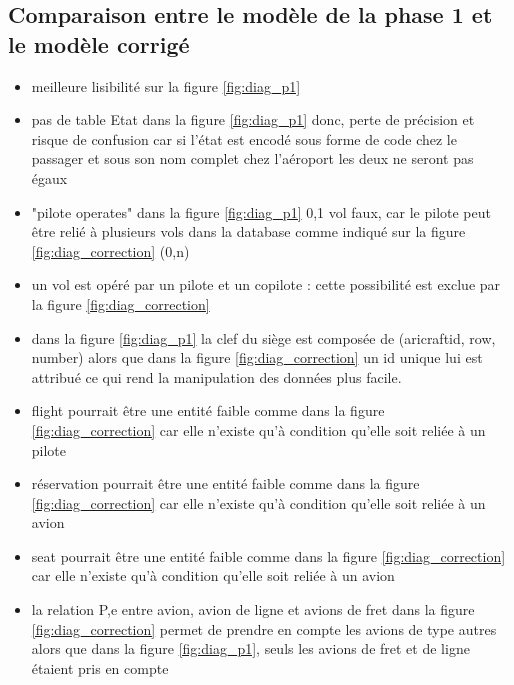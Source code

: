 \documentclass[french, utf8]{article}
\begin{document}
\subsection{Comparaison entre le modèle de la phase 1 et le modèle corrigé}

\begin{itemize}
    \item meilleure lisibilité sur la figure \ref{fig:diag_p1}
    \item pas de table Etat dans la figure \ref{fig:diag_p1} donc, perte de précision et risque de confusion car si l'état est encodé sous forme de code chez le passager et sous son nom complet chez l'aéroport les deux ne seront pas égaux

    \item "pilote operates" dans la figure \ref{fig:diag_p1} 0,1 vol faux, car le pilote peut être relié à plusieurs vols dans la database comme indiqué sur la figure \ref{fig:diag_correction} (0,n)
    \item un vol est opéré par un pilote et un copilote : cette possibilité est exclue par la figure \ref{fig:diag_correction}
    \item dans la figure \ref{fig:diag_p1} la clef du siège est composée de (aricraftid, row, number) alors que dans la figure \ref{fig:diag_correction} un id unique lui est attribué ce qui rend la manipulation des données plus facile.
    \item flight pourrait être une entité faible comme dans la figure  \ref{fig:diag_correction} car elle n'existe qu'à condition qu'elle soit reliée à un pilote
    \item réservation pourrait être une entité faible comme dans la figure \ref{fig:diag_correction} car elle n'existe qu'à condition qu'elle soit reliée à un avion
    \item seat pourrait être une entité faible comme dans la figure \ref{fig:diag_correction} car elle n'existe qu'à condition qu'elle soit reliée à un avion
    \item la relation P,e entre avion, avion de ligne et avions de fret dans la figure \ref{fig:diag_correction} permet de prendre en compte les avions de type autres alors que dans la figure \ref{fig:diag_p1}, seuls les avions de fret et de ligne étaient pris en compte
\end{itemize}

\newpage
\end{document}
